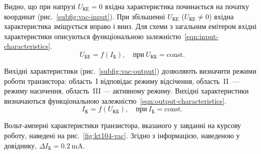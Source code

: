 \documentclass[14pt,ukrainian,utf8,simple]{eskdtext}
\begin{document}
		Видно, що при напрузі $U_{\text{КЕ}} = 0$ вхідна характеристика починається на початку координат (рис.~\ref{subfig:vac-input}). При збільшенні $U_{\text{КЕ}}$ ($U_{\text{КЕ}} \neq 0$) вхідна характеристика зміщується вправо і вниз. Для схеми з загальним емітером вхідні характеристики описуються функціональною залежністю~\eqref{eqn:input-characteristics}.
		\begin{equation}
		\label{eqn:input-characteristics}
			U_{\text{БЕ}} = f\left( I_{\text{Б}} \right), \quad \text{при}~U_{\text{КБ}} = \text{const}.
		\end{equation}
		
		Вихідні характеристики (рис.~\ref{subfig:vac-output}) дозволяють визначити режими роботи транзистора: область~I відповідає режиму відсічення, область~II~— режиму насичення, область~III — активному режиму. Вихідні характеристики визначаються функціональною залежністю~\eqref{eqn:output-characteristics}.
		\begin{equation}
		\label{eqn:output-characteristics}
			I_{\text{К}} = f\left( U_{\text{КБ}} \right), \quad \text{при}~I_{\text{Б}} = \text{const}.
		\end{equation}
		
		Вольт-амперні характеристики транзистора, вказаного у завданні на курсову роботу, наведені на рис.~\ref{fig:kt104-vac}. Згідно з інформацією, наведеною у довіднику, $\Delta I_{\text{Б}} = \SI{0,2}{\milli\ampere}$.
		
\end{document}
